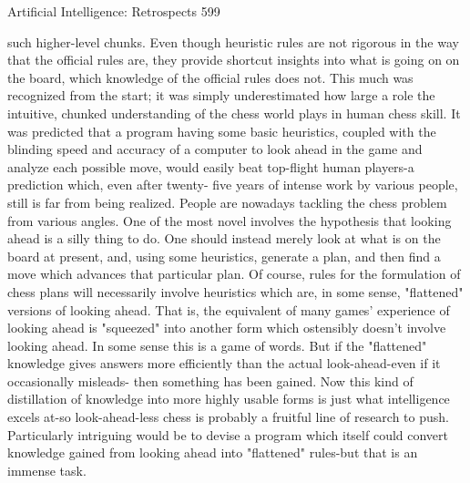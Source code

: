 {Artificial Intelligence: Retrospects                                                    599

   such higher-level chunks. Even though heuristic rules are not rigorous in the way
   that the official rules are, they provide shortcut insights into what is going on on the
   board, which knowledge of the official rules does not. This much was recognized
   from the start; it was simply underestimated how large a role the intuitive, chunked
   understanding of the chess world plays in human chess skill. It was predicted that a
   program having some basic heuristics, coupled with the blinding speed and
   accuracy of a computer to look ahead in the game and analyze each possible move,
   would easily beat top-flight human players-a prediction which, even after twenty-
   five years of intense work by various people, still is far from being realized.
        People are nowadays tackling the chess problem from various angles. One of
   the most novel involves the hypothesis that looking ahead is a silly thing to do. One
   should instead merely look at what is on the board at present, and, using some
   heuristics, generate a plan, and then find a move which advances that particular
   plan. Of course, rules for the formulation of chess plans will necessarily involve
   heuristics which are, in some sense, "flattened" versions of looking ahead. That is,
   the equivalent of many games' experience of looking ahead is "squeezed" into
   another form which ostensibly doesn't involve looking ahead. In some sense this is
   a game of words. But if the "flattened" knowledge gives answers more efficiently
   than the actual look-ahead-even if it occasionally misleads- then something has
   been gained. Now this kind of distillation of knowledge into more highly usable
   forms is just what intelligence excels at-so look-ahead-less chess is probably a
   fruitful line of research to push. Particularly intriguing would be to devise a
   program which itself could convert knowledge gained from looking ahead into
   "flattened" rules-but that is an immense task.

}
